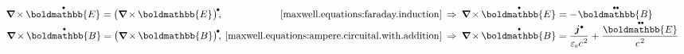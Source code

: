 \nopagebreak\begin{equation*}
\begin{array}{r@{\hspace{.4em}}r@{\hspace{.5em}}c@{\hspace{.5em}}l}
%
\boldnabla \hspace{-0.15ex} \times \hspace{-0.1ex} \mathdotabove{\boldmathbb{E}} \hspace{.1ex}
= \hspace{-0.1ex} \bigl( \boldnabla \hspace{-0.15ex} \times \hspace{-0.1ex} \boldmathbb{E} \hspace{.1ex} \bigr)^{\hspace{-0.2ex}\tikz[baseline=-0.4ex]\draw[black, fill=black] (0,0) circle (.28ex);}
\hspace{-0.33ex} , &
\eqref{maxwell.equations:faraday.induction}
& \Rightarrow &
\boldnabla \hspace{-0.15ex} \times \hspace{-0.1ex} \mathdotabove{\boldmathbb{E}} \hspace{.1ex}
= - \hspace{.15ex} \mathdotdotabove{\boldmathbb{B}}
\\[.1em]
%
\boldnabla \hspace{-0.15ex} \times \hspace{-0.1ex} \mathdotabove{\boldmathbb{B}}
= \hspace{-0.1ex} \bigl( \boldnabla \hspace{-0.15ex} \times \hspace{-0.1ex} \boldmathbb{B} \bigr)^{\hspace{-0.2ex}\tikz[baseline=-0.4ex]\draw[black, fill=black] (0,0) circle (.28ex);}
\hspace{-0.33ex} , &
\eqref{maxwell.equations:ampere.circuital.with.addition}
& \Rightarrow &
\boldnabla \hspace{-0.15ex} \times \hspace{-0.1ex} \mathdotabove{\boldmathbb{B}}
= \displaystyle \frac{\currentdensity^{\hspace{.1ex}\tikz[baseline=-0.36ex]\draw[black, fill=black] (0,0) circle (.28ex);}}{\raisemath{-0.1em}{ \vacuumpermittivity \hspace{.1ex} c^{\hspace{.16ex}2} }} + \hspace{.1ex} \displaystyle \frac{\raisemath{-0.12em}{ \mathdotdotabove{\boldmathbb{E}} }}{\raisemath{-0.1em}{ c^{\hspace{.16ex}2} }}
\end{array}
\end{equation*}

